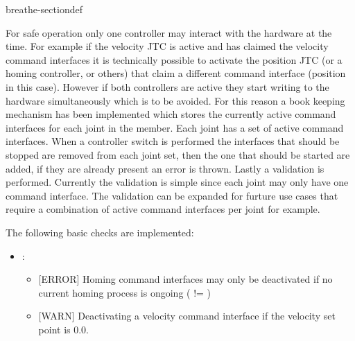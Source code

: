 \documentclass[letterpaper,10pt,english]{sphinxmanual}
\begin{document}
\begin{fulllineitems}
\begin{sphinxuseclass}{breathe-sectiondef}
\begin{fulllineitems}
\sphinxAtStartPar
For safe operation only one controller may interact with the hardware at the time. For example if the velocity JTC is active and has claimed the velocity command interfaces it is technically possible to activate the position JTC (or a homing controller, or others) that claim a different command interface (position in this case). However if both controllers are active they start writing to the hardware simultaneously which is to be avoided. For this reason a book keeping mechanism has been implemented which stores the currently active command interfaces for each joint in the {\hyperref[\detokenize{code/bioscara_hardware_interfaces/index:classbioscara__hardware__interfaces_1_1BioscaraArmHardwareInterface_1afc419a32f050cf461e64d958fed917ce}]{}}
\sphinxAtStartPar
member. Each joint has a set of active command interfaces. When a controller switch is performed the interfaces that should be stopped are removed from each joint set, then the one that should be started are added, if they are already present an error is thrown. Lastly a validation is performed. Currently the validation is simple since each joint may only have one command interface. The validation can be expanded for furture use cases that require a combination of active command interfaces per joint for example.

\sphinxAtStartPar
The following basic checks are implemented:
\begin{itemize}
\item {} 
\sphinxAtStartPar
{}:\begin{itemize}
\item {} 
\sphinxAtStartPar
{[}ERROR{]} Homing command interfaces may only be deactivated if no current homing process is ongoing ({\hyperref[\detokenize{code/bioscara_hardware_drivers/index:classbioscara__hardware__drivers_1_1BaseJoint_1a412c4e474be5de0820d88b7d1d6084de}]{}} != {\hyperref[\detokenize{code/bioscara_hardware_drivers/index:classbioscara__hardware__drivers_1_1BaseJoint_1affbc9ba6c17b02af32647dc76796de13a93a9a074f04be4b2316dbbca5882b6fa}]{}})

\item {} 
\sphinxAtStartPar
{[}WARN{]} Deactivating a velocity command interface if the velocity set point is 0.0.


\end{itemize}
\end{itemize}
\end{fulllineitems}
\end{sphinxuseclass}
\end{fulllineitems}
\end{document}
